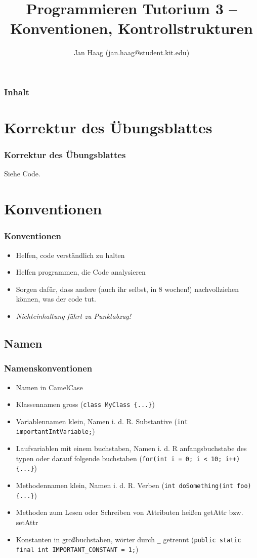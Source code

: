 \documentclass{beamer}
\author{Jan Haag (jan.haag@student.kit.edu)}
\title{Programmieren Tutorium 3 -- Konventionen, Kontrollstrukturen}
\institute{Institut f\"{u}r Zeritfizierbare und Vertra\"{u}nsw\"{u}rdige Informatiksysteme (ZVI)}
\begin{document}
\begin{frame}
\maketitle
\end{frame}

\begin{frame}
\frametitle{Inhalt}
\tableofcontents
\end{frame}

\section{Korrektur des \"{U}bungsblattes}
\begin{frame}
\frametitle{Korrektur des \"{U}bungsblattes}
Siehe Code.
\end{frame}

\section{Konventionen}
\begin{frame}
\frametitle{Konventionen}
\begin{itemize}
\item Helfen, code verst\"{a}ndlich zu halten
\item Helfen programmen, die Code analysieren
\pause
\item Sorgen daf\"{u}r, dass andere (auch ihr selbst, in 8 wochen!) nachvollziehen k\"{o}nnen, was der code tut.
\pause
\item \emph{Nichteinhaltung f\"{u}hrt zu Punktabzug!}
\end{itemize}
\end{frame}

\subsection{Namen}
\begin{frame}[fragile]
\frametitle{Namenskonventionen}
\begin{itemize}
\item Namen in CamelCase
\item Klassennamen gross (\verb|class MyClass {...}|)
\item Variablennamen klein, Namen i. d. R. Substantive (\verb|int importantIntVariable;|)
\item Laufvariablen mit einem buchstaben, Namen i. d. R anfangsbuchstabe des
typen oder darauf folgende buchstaben (\verb|for(int i = 0; i < 10; i++) {...}|)
\item Methodennamen klein, Namen i. d. R. Verben (\verb|int doSomething(int foo) {...}|)
\item Methoden zum Lesen oder Schreiben von Attributen hei\ss{}en getAttr bzw. setAttr
\item Konstanten in gro\ss{}buchstaben, w\"{o}rter durch \verb|_|
getrennt (\verb|public static final int IMPORTANT_CONSTANT = 1;|)
\end{itemize}
\end{frame}
\end{document}
